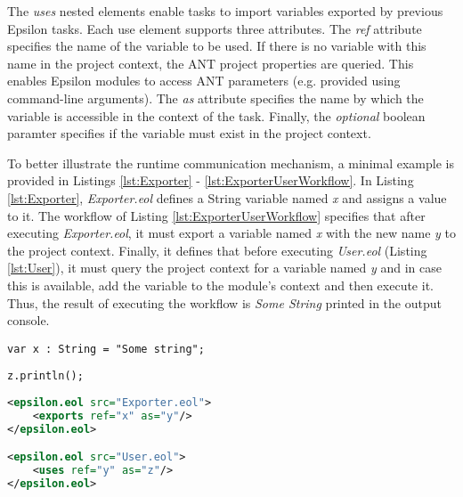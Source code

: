 The \emph{uses} nested elements enable tasks to import variables exported by previous Epsilon tasks. Each use element supports three attributes. The \emph{ref} attribute specifies the name of the variable to be used. If there is no variable with this name in the project context, the ANT project properties are queried. This enables Epsilon modules to access ANT parameters (e.g. provided using command-line arguments). The \emph{as} attribute specifies the name by which the variable is accessible in the context of the task. Finally, the \emph{optional} boolean paramter specifies if the variable must exist in the project context.

To better illustrate the runtime communication mechanism, a minimal example is provided in Listings \ref{lst:Exporter} - \ref{lst:ExporterUserWorkflow}. In Listing \ref{lst:Exporter}, \emph{Exporter.eol} defines a String variable named \emph{x} and assigns a value to it. The workflow of Listing \ref{lst:ExporterUserWorkflow} specifies that after executing \emph{Exporter.eol}, it must export a variable named \emph{x} with the new name \emph{y} to the project context. Finally, it defines that before executing \emph{User.eol} (Listing \ref{lst:User}), it must query the project context for a variable named \emph{y} and in case this is available, add the variable to the module's context and then execute it. Thus, the result of executing the workflow is \emph{Some String} printed in the output console.

\begin{lstlisting}[float=tbp, basicstyle=\ttfamily\footnotesize, nolol=true, flexiblecolumns=true, caption=Source code of the Exporter.eol module, label=lst:Exporter, language=EOL]
var x : String = "Some string";
\end{lstlisting}

\begin{lstlisting}[float=tbp, basicstyle=\ttfamily\footnotesize, nolol=true, flexiblecolumns=true, caption=Source code of the User.eol module, label=lst:User, language=EOL]
z.println();
\end{lstlisting}

\begin{lstlisting}[float=tbp, basicstyle=\ttfamily\footnotesize, nolol=true, flexiblecolumns=true, caption=ANT Workflow connecting modules  \ref{lst:Exporter} and \ref{lst:User} using the epsilon.eol task, label=lst:ExporterUserWorkflow , language=XML]
<epsilon.eol src="Exporter.eol">
	<exports ref="x" as="y"/>
</epsilon.eol>

<epsilon.eol src="User.eol">
	<uses ref="y" as="z"/>
</epsilon.eol>
\end{lstlisting}